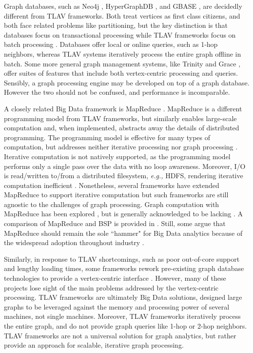 \documentclass[reprint,twocolumn,showpacs,preprintnumbers,amsmath, aps,pre,amssymb]{revtex4-1}
\begin{document}
Graph databases, such as Neo4j \cite{Webber2012}, HyperGraphDB \cite{Iordanov2010}, and GBASE \cite{Kang2011}, are decidedly different from TLAV frameworks.  Both treat vertices as first class citizens, and both face related problems like partitioning, but the key distinction is that databases focus on transactional processing while TLAV frameworks focus on batch processing \cite{Chen2012}. Databases offer local or online queries, such as 1-hop neighbors, whereas TLAV systems iteratively process the entire graph offline in batch.  Some more general graph management systems, like  Trinity \cite{Shao2013} and Grace \cite{Prabhakaran2012}, offer suites of features that include both vertex-centric processing and queries.  Sensibly, a graph processing engine may be developed on top of a graph database.  However the two should not be confused, and performance is incomparable.

A closely related Big Data framework is MapReduce \cite{Dean2008,Polato2014}.  MapReduce is a different programming model from TLAV frameworks, but similarly enables large-scale computation and, when implemented, abstracts away the details of distributed programming.  The programming model is effective for many types of computation, but addresses neither iterative processing nor graph processing \cite{Polato2014,Malewicz2010}.  Iterative computation is not natively supported, as the programming model performs only a single pass over the data with no loop awareness.  Moreover, I/O is read/written to/from a distributed filesystem, {\em e.g.,} HDFS, rendering iterative computation inefficient \cite{Polato2014}.  Nonetheless, several frameworks have extended MapReduce to support iterative computation \cite{Ekanayake2010,Bu2012,Zhang2012} but such frameworks are still agnostic to the challenges of graph processing.  Graph computation with MapReduce has been explored \cite{Lin2010}, but is generally acknowledged to be lacking \cite{Cohen2009,Malewicz2010}.  A comparison of MapReduce and BSP is provided in \cite{Kajdanowicz2014}.  Still, some argue that MapReduce should remain the sole ``hammer" for Big Data analytics because of the widespread adoption throughout industry \cite{Lin2013}.

Similarly, in response to TLAV shortcomings, such as poor out-of-core support and lengthy loading times, some frameworks rework pre-existing graph database technologies to provide a vertex-centric interface \cite{Fan2015}.  However, many of these projects lose sight of the main problems addressed by the vertex-centric processing.  TLAV frameworks are ultimately Big Data solutions, designed large graphs to be leveraged against the memory and processing power of several machines, not single machines.  Moreover, TLAV frameworks iteratively process the entire graph, and do not provide graph queries like 1-hop or 2-hop neighbors.  TLAV frameworks are not a universal solution for graph analytics, but rather provide an approach for scalable, iterative graph processing.
\end{document}
